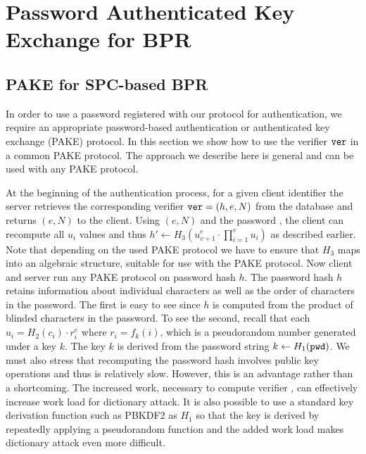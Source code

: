 \section{Password Authenticated Key Exchange for BPR}\label{sec:pake}


\subsection{PAKE for SPC-based BPR}
In order to use a password registered with our protocol for authentication, we require an appropriate password-based authentication or authenticated key exchange (PAKE) protocol.
In this section we show how to use the verifier $\mathtt{ver}$ in a common PAKE protocol. The approach we describe here is general and can be used with any PAKE protocol.

At the beginning of the authentication process, for a given client identifier the server retrieves the corresponding verifier $\mathtt{ver}=(h, e, N)$ from the database and returns $(e,N)$ to the client.
Using $(e,N)$ and the password \pwd, the client can recompute all $u_i$ values and thus $h'\gets H_3(u_{v+1}^e\cdot\prod_{i=1}^{v}u_i)$ as described earlier.
Note that depending on the used PAKE protocol we have to ensure that $H_3$ maps into an algebraic structure, suitable for use with the PAKE protocol.
Now client and server run any PAKE protocol on password hash $h$. The password hash $h$ retains information about individual characters as well as the order of characters in the password. The first is easy to see since $h$ is computed from the product of blinded characters in the password.  
To see the second, recall that each $u_i=H_2(c_i)\cdot r_i^e$ where $r_i=f_k(i)$, which is a pseudorandom number generated under a key $k$. 
The key $k$ is derived from the password string $k\gets H_1(\mathtt{pwd})$. 
We must also stress that recomputing the password hash involves public key operations and thus is relatively slow.
However, this is an advantage rather than a shortcoming. 
The increased work, necessary to compute verifier \ver, can effectively increase work load for dictionary attack. 
It is also possible to use a standard key derivation function such as PBKDF2 \cite{rfc2898} as $H_1$ so that the key is derived by repeatedly applying a pseudorandom function and the added work load makes dictionary attack even more difficult.

